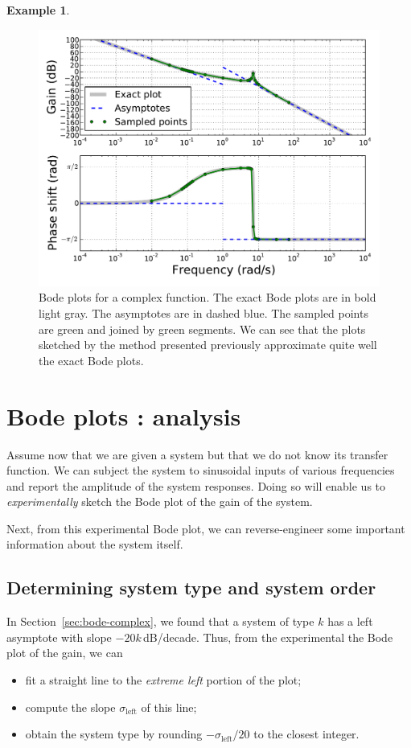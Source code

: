 \documentclass[a4paper,11pt]{report}
\theoremstyle{definition}
\newtheorem{mdexample}{Example}
\newenvironment{example}%
  {\vspace{0.1cm}\begin{mdframed}[backgroundcolor=lightgray]\begin{mdexample}}%
  {\end{mdexample}\end{mdframed}\vspace{0.1cm}}
\begin{document}
\begin{example}
\begin{description}
  \begin{figure}[H]
    \centering
    \includegraphics[width=12cm]{fig/bode-complex.pdf}
    \caption{Bode plots for a complex function. The exact Bode plots
      are in bold light gray. The asymptotes are in dashed blue. The
      sampled points are green and joined by green segments. We can
      see that the plots sketched by the method presented previously
      approximate quite well the exact Bode plots.}
    \label{fig:bode-complex}
  \end{figure}
  \end{description}
\end{example}

\section{Bode plots : analysis}
\label{sec:bode-analysis}

Assume now that we are given a system but that we do not know its
transfer function. We can subject the system to sinusoidal inputs of
various frequencies and report the amplitude of the system
responses. Doing so will enable us to \emph{experimentally} sketch the
Bode plot of the gain of the system.

Next, from this experimental Bode plot, we can reverse-engineer some
important information about the system itself.

\subsection{Determining system type and system order}

In Section~\ref{sec:bode-complex}, we found that a system of type $k$
has a left asymptote with slope $-20k$\,dB/decade. Thus, from the
experimental the Bode plot of the gain, we can
\begin{itemize}
\item fit a straight line to the \emph{extreme left} portion of the
  plot;
\item compute the slope $\sigma_\mathrm{left}$ of this line;
\item obtain the system type by rounding $-\sigma_\mathrm{left}/20$
  to the closest integer.
\end{itemize}
\end{document}
